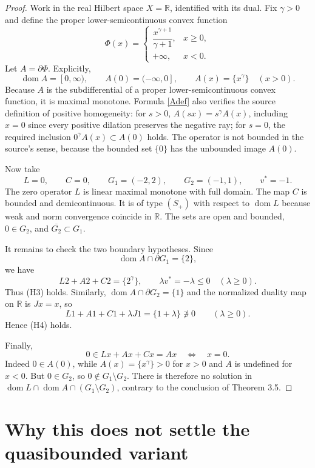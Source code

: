 \documentclass[11pt]{article}
\newcommand{\R}{\mathbb R}
\newcommand{\dom}{\operatorname{dom}}
\begin{document}
\begin{proof}
Work in the real Hilbert space $X=\R$, identified with its dual.  Fix $\gamma>0$ and define the proper lower-semicontinuous convex function
\[
 \Phi(x)=
 \begin{cases}
   \dfrac{x^{\gamma+1}}{\gamma+1},&x\geq0,\\[4pt]
   +\infty,&x<0.
 \end{cases}
\]
Let $A=\partial\Phi$.  Explicitly,
\begin{equation}\label{Adef}
 \dom A=[0,\infty),\qquad
 A(0)=(-\infty,0],\qquad
 A(x)=\{x^\gamma\}\quad(x>0).
\end{equation}
Because $A$ is the subdifferential of a proper lower-semicontinuous convex function, it is maximal monotone.  Formula \eqref{Adef} also verifies the source definition of positive homogeneity: for $s>0$, $A(sx)=s^\gamma A(x)$, including $x=0$ since every positive dilation preserves the negative ray; for $s=0$, the required inclusion $0^\gamma A(x)\subset A(0)$ holds.  The operator is not bounded in the source's sense, because the bounded set $\{0\}$ has the unbounded image $A(0)$.

Now take
\[
 L=0,\qquad C=0,\qquad G_1=(-2,2),\qquad G_2=(-1,1),
 \qquad v^*=-1.
\]
The zero operator $L$ is linear maximal monotone with full domain.  The map $C$ is bounded and demicontinuous.  It is of type $(S_+)$ with respect to $\dom L$ because weak and norm convergence coincide in $\R$.  The sets are open and bounded, $0\in G_2$, and $\overline{G_2}\subset G_1$.

It remains to check the two boundary hypotheses.  Since
\[
 \dom A\cap\partial G_1=\{2\},
\]
we have
\[
 L2+A2+C2=\{2^\gamma\},
 \qquad \lambda v^*=-\lambda\leq0\quad(\lambda\geq0).
\]
Thus (H3) holds.  Similarly, $\dom A\cap\partial G_2=\{1\}$ and the normalized duality map on $\R$ is $Jx=x$, so
\[
 L1+A1+C1+\lambda J1=\{1+\lambda\}\not\ni0
 \qquad(\lambda\geq0).
\]
Hence (H4) holds.

Finally,
\[
 0\in Lx+Ax+Cx=Ax
 \quad\Longleftrightarrow\quad x=0.
\]
Indeed $0\in A(0)$, while $A(x)=\{x^\gamma\}>0$ for $x>0$ and $A$ is undefined for $x<0$.  But $0\in G_2$, so $0\notin G_1\setminus G_2$.  There is therefore no solution in
$\dom L\cap\dom A\cap(G_1\setminus G_2)$, contrary to the conclusion of Theorem 3.5.
\end{proof}

\section{Why this does not settle the quasibounded variant}
\end{document}
